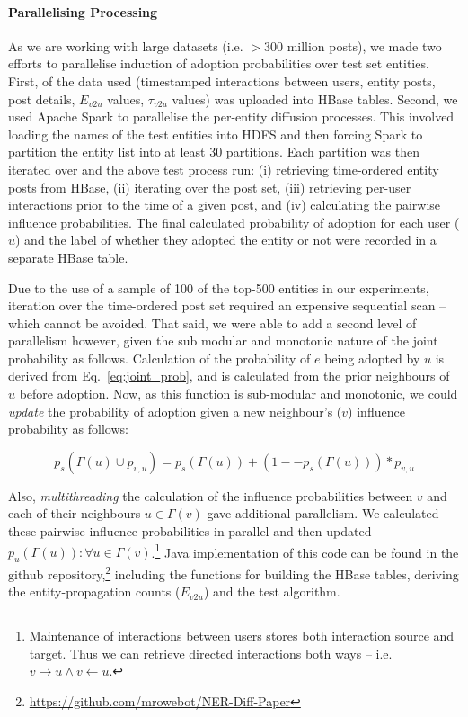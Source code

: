 \documentclass[acmsmall]{acmart}
\begin{document}
\paragraph{Parallelising Processing}
As we are working with large datasets (i.e. $>300$ million posts), we made two efforts to parallelise induction of adoption probabilities over test set entities.
First, of the data used (timestamped interactions between users, entity posts, post details, $E_{v2u}$ values, $\tau_{v2u}$ values) was uploaded into HBase tables. %
Second, we used Apache Spark%
 to parallelise the per-entity diffusion processes.
This involved loading the names of the test entities into HDFS and then forcing Spark to partition the entity list into at least 30 partitions.
Each partition was then iterated over and the above test process run: (i) retrieving time-ordered entity posts from HBase, (ii) iterating over the post set, (iii) retrieving per-user interactions prior to the time of a given post, and (iv) calculating the pairwise influence probabilities.
The final calculated probability of adoption for each user ($u$) and the label of whether they adopted the entity or not were recorded in a separate HBase table.

Due to the use of a sample of 100 of the top-500 entities in our experiments, iteration over the time-ordered post set required an expensive sequential scan -- which cannot be avoided.
That said, we were able to add a second level of parallelism however, given the sub modular and monotonic nature of the joint probability as follows.
Calculation of the probability of $e$ being adopted by $u$ is derived from Eq.~\ref{eq:joint_prob}, and is calculated from the prior neighbours of $u$ before adoption.
Now, as this function is sub-modular and monotonic, we could \emph{update} the probability of adoption given a new neighbour's ($v$) influence probability as follows:

\begin{equation}
p_s(\Gamma(u) \cup p_{v,u}) = p_s(\Gamma(u)) + (1 -- p_s(\Gamma(u))) * p_{v,u}
\end{equation}

Also, \emph{multithreading} the calculation of the influence probabilities between $v$ and each of their neighbours $u \in \Gamma(v)$ gave additional parallelism. We calculated these pairwise influence probabilities in parallel and then updated $p_u(\Gamma(u)) : \forall u \in \Gamma(v)$.\footnote{Maintenance of interactions between users stores both interaction source and target. Thus we can retrieve directed interactions both ways -- i.e. $v \rightarrow u \wedge v \leftarrow u$.}
Java implementation of this code can be found in the github repository,\footnote{\url{https://github.com/mrowebot/NER-Diff-Paper}} including the functions for building the HBase tables, deriving the entity-propagation counts ($E_{v2u}$) and the test algorithm.
\end{document}
